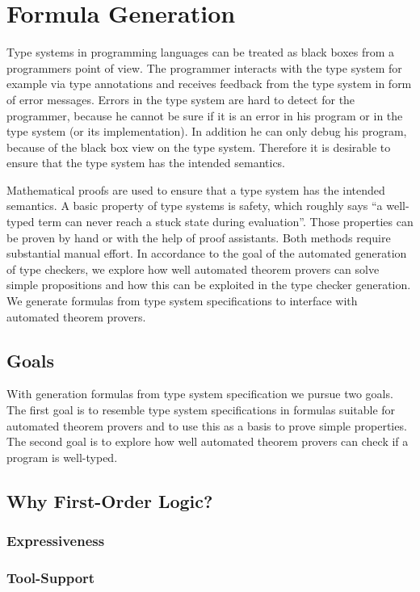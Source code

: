 \chapter{Formula Generation}
\label{ch:formula-generation}
Type systems in programming languages can be treated as black boxes
from a programmers point of view. The programmer interacts with the
type system for example via type annotations and receives feedback
from the type system in form of error messages. Errors in the type
system are hard to detect for the programmer, because he cannot be
sure if it is an error in his program or in the type system (or its
implementation). In addition he can only debug his program, because of
the black box view on the type system. Therefore it is desirable to
ensure that the type system has the intended semantics.

Mathematical proofs are used to ensure that a type system has the
intended semantics. A basic property of type systems is safety, which
roughly says ``a well-typed term can never reach a stuck state during
evaluation''\cite{Pierce:2002:TPL:509043}. Those properties can be proven by
hand or with the help of proof assistants. Both methods require
substantial manual effort. In accordance to the goal of the automated
generation of type checkers, we explore how well automated theorem
provers can solve simple propositions and how this can be exploited in
the type checker generation. We generate formulas from type system
specifications to interface with automated theorem provers.
 
\section{Goals}
With generation formulas from type system specification we pursue two
goals. The first goal is to resemble type system specifications
in formulas suitable for automated theorem provers and to use this as
a basis to prove simple properties. The second goal is to explore how
well automated theorem provers can check if a program is well-typed.

\section{Why First-Order Logic?}
\subsection{Expressiveness}
\subsection{Tool-Support}
